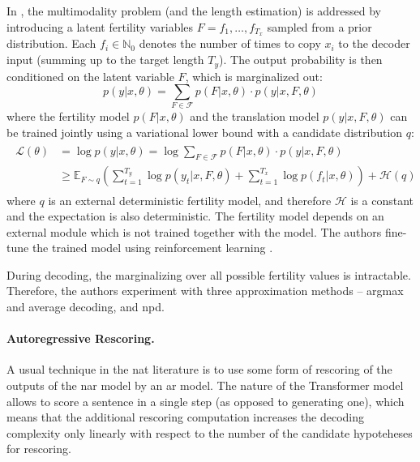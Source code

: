 In \citet{gu2017nonautoregressive}, the multimodality problem (and the length
estimation) is addressed by introducing a latent fertility variables
$F = f_1, \ldots, f_{T_x}$ sampled from a prior distribution. Each
$f_i \in \mathbb{N}_0$ denotes the number of times to copy $x_i$ to the decoder
input (summing up to the target length $T_y$). The output probability is then
conditioned on the latent variable $F$, which is marginalized out:
%
\begin{equation}
  p(y|x, \theta) = \sum_{F \in \mathcal{F}} p(F|x, \theta) \cdot p(y|x, F, \theta)
\end{equation}
%
where the fertility model $p(F|x, \theta)$ and the translation model
$p(y|x, F, \theta)$ can be trained jointly using a variational lower bound with
a candidate distribution $q$:
\begin{align}
  \begin{split}
    \mathcal{L}(\theta)
    & = \log p(y|x, \theta) = \log \sum_{F \in \mathcal{F}} p(F| x, \theta ) \cdot p(y | x, F, \theta) \\
    & \geq \mathbb{E}_{F \sim q} \left(\sum_{t=1}^{T_y} \log p(y_t | x, F, \theta)
      + \sum_{t=1}^{T_x} \log p(f_t | x, \theta) \right) + \mathcal{H}(q)
  \end{split}
\end{align}
%
where $q$ is an external deterministic fertility model, and therefore
$\mathcal{H}$ is a constant and the expectation is also deterministic. 
%
The fertility model depends on an external module which is not trained together
with the model. The authors fine-tune the trained model using reinforcement
learning \citep{williams1992simple}.

During decoding, the marginalizing over all possible fertility values is
intractable. Therefore, the authors experiment with three approximation methods
-- argmax and average decoding, and \ac{npd}.

\paragraph{Autoregressive Rescoring.} A usual technique in the \ac{nat}
literature is to use some form of rescoring of the outputs of the \acl{nar}
model by an \acl{ar} model. The nature of the Transformer model allows to score
a sentence in a single step (as opposed to generating one), which means that
the additional rescoring computation increases the decoding complexity only
linearly with respect to the number of the candidate hypoteheses for rescoring.

